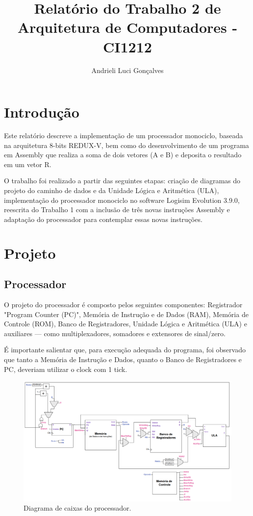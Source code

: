 \documentclass[twocolumn, 11pt]{article}
\author{Andrieli Luci Gonçalves}
\title{Relatório do Trabalho 2 de Arquitetura de Computadores - CI1212}
\begin{document}
\maketitle        

\section{Introdução}

Este relatório descreve a implementação de um processador monociclo, baseada na arquitetura 8-bits REDUX-V, bem como do desenvolvimento de um programa em Assembly que realiza a soma de dois vetores (A e B) e deposita o resultado em um vetor R.

O trabalho foi realizado a partir das seguintes etapas: criação de diagramas do projeto do caminho de dados e da Unidade Lógica e Aritmética (ULA), implementação do processador monociclo no software Logisim Evolution 3.9.0, reescrita do Trabalho 1 com a inclusão de três novas instruções Assembly e adaptação do processador para contemplar essas novas instruções. 

\section{Projeto}

\subsection{Processador}

O projeto do processador é composto pelos seguintes componentes: Registrador "Program Counter (PC)", Memória de Instrução e de Dados (RAM), Memória de Controle (ROM), Banco de Registradores, Unidade Lógica e Aritmética (ULA) e auxiliares — como multiplexadores, somadores e extensores de sinal/zero.

É importante salientar que, para execução adequada do programa, foi observado que tanto a Memória de Instrução e Dados, quanto o Banco de Registradores e PC, deveriam utilizar o clock com 1 tick.

\begin{figure}[h]
    \centering
    \includegraphics[width=1\linewidth]{datapath_processador.png}
    \caption{Diagrama de caixas do processador.}
    \label{fig:enter-label}
\end{figure}
\end{document}
